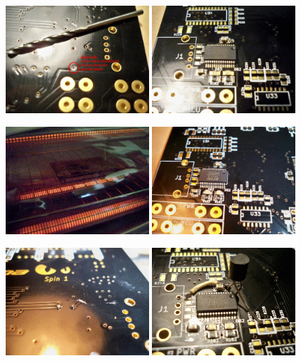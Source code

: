 \documentclass[12pt,a4paper,titlepage]{article}
\begin{document}
\begin{enumerate}
\includegraphics[width = 0.4\textwidth]{images/step6.png}
\includegraphics[width = 0.4\textwidth]{images/step7.jpg}

\includegraphics[width = 0.4\textwidth]{images/step8.jpg}
\includegraphics[width = 0.4\textwidth]{images/step9.jpg}

\includegraphics[width = 0.4\textwidth]{images/step10.jpg}
\includegraphics[width = 0.4\textwidth]{images/step11.jpg}


\end{enumerate}
\end{document}
